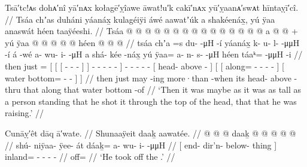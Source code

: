\ex\label{ex:91-182-shot-it-above-head}%
%
\begingl
	\glpreamble	Tsā′tc!ᴀs dohᴀ′nî yā′nᴀx kołagē′ỵîawe āwat!u′k cakī′nᴀx yū′ỵaanᴀ′swᴀt hīntaỵī′cî. //
	\glpreamble	Tsáa chʼas duháni yáanáx̱ kulagéiÿi áwé aawatʼúk a shakéenáx̱, yú ÿaa anaswát héen taaÿéeshi. //
	\gla	Tsáa  @ {}
		{} {} {}  @ {} @ {} @ {} {}  {} 
			 @ {} @ {} @ {} @ {} @ {} @ {}
		 @ {}
		 @ {} @ {} @ {} @ {}
		{} a  @ {} @ {} {} +
		{} yú {} ÿaa @  @ {} @ {} @ {} @ {} {} {}
			{} héen  @ {} @ {} @ {} {} {} //
	\glb	tsáa chʼa =s
		{} {} {} du-  -μH -í {} yáanáx̱ {}
			k- u- l-  -μμH -í {}
		á -wé
		a- wu- i-  -μH
		{} a shá- kée -náx̱ {}
		{} yú {} ÿaa= a- n- s-  -μH {} {}
			{} héen táaᵏ=  -μμH -i {} {} //
	\glc	then just =
		{}[ {}[ {}[
					-  - - {}]
				 {}]
			- - -  - - {}]
		 -
		- - -  -
		{}[  head- above - {}]
		{}[  
				{}[ along= - - -
					 - \· {}]
			{}[ water bottom=  - - {}] {}] //
	\gld	then just \•may
		{} {} {}  {} {} -ing {}
				more·than {}
			 {} {} {} {} -when {}
		 {}
		 {} {} {} {}
		{} its head- above -thru {}
		{} that {} along  {} {} {} {}
					\·that {}
			{} water bottom  {} -of {} {} //
	\glft	‘Then it was maybe as it was as tall as a person standing that he shot it through the top of the head, that  that he was raising.’
		//
\endgl
\xe

\ex\label{ex:91-183-}%
%
\begingl
	\glpreamble	Cunāỵ′êt dāq ā′wate. //
	\glpreamble	Shunaaÿeit daaḵ aawatée. //
	\gla	{}  @ {} @ {} @ {} {}
		daaḵ @  @ {} @ {} @ {} @ {} //
	\glb	{} shú- niÿaa- ÿee- át {}
		dáaḵ= a- wu- i-  -μμH //
	\glc	{}[ end- dir’n- below- thing {}]
		inland= - - -  - //
	\gld	{}  {} {} {} {}
		off=  {} {} {} {} //
	\glft	‘He took off the .’
		//
\endgl
\xe

